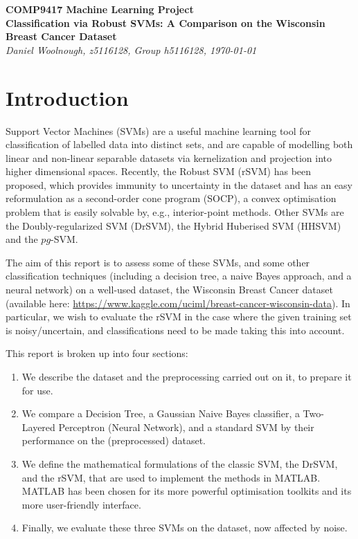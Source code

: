\documentclass[11pt]{article}
\begin{document}
\begin{center}
\textbf{\large{COMP9417 Machine Learning Project}}
\\[10pt]
\textbf{\huge{Classification via Robust SVMs: A Comparison on the Wisconsin Breast Cancer Dataset}}
\\[10pt]
{\it \large{Daniel Woolnough, z5116128, Group h5116128, \today}}
\end{center}
\section*{Introduction}
Support Vector Machines (SVMs) are a useful machine learning tool for classification of labelled data into distinct sets, and are capable of modelling both linear and non-linear separable datasets via kernelization and projection into higher dimensional spaces. Recently, the Robust SVM (rSVM) has been proposed, which provides immunity to uncertainty in the dataset and has an easy reformulation as a second-order cone program (SOCP), a convex optimisation problem that is easily solvable by, e.g., interior-point methods. Other SVMs are the Doubly-regularized SVM (DrSVM), the Hybrid Huberised SVM (HHSVM) and the $pg$-SVM. 

The aim of this report is to assess some of these SVMs, and some other classification techniques (including a decision tree, a naive Bayes approach, and a neural network) on a well-used dataset, the Wisconsin Breast Cancer dataset (available here: \url{https://www.kaggle.com/uciml/breast-cancer-wisconsin-data}). In particular, we wish to evaluate the rSVM in the case where the given training set is noisy/uncertain, and classifications need to be made taking this into account. 

This report is broken up into four sections:
\begin{enumerate}
	\item We describe the dataset and the preprocessing carried out on it, to prepare it for use. 
	\item We compare a Decision Tree, a Gaussian Naive Bayes classifier, a Two-Layered Perceptron (Neural Network), and a standard SVM by their performance on the (preprocessed) dataset. 
	\item We define the mathematical formulations of the classic SVM, the DrSVM, and the rSVM, that are used to implement the methods in MATLAB. MATLAB has been chosen for its more powerful optimisation toolkits and its more user-friendly interface. 
	\item Finally, we evaluate these three SVMs on the dataset, now affected by noise. 
\end{enumerate}
\end{document}
